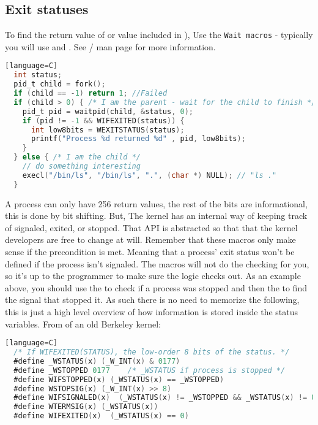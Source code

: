 \subsection{Exit statuses}

To find the return value of  or value included in ), Use the \texttt{Wait macros} - typically you will use  and  . See / man page for more information.

\begin{lstlisting}[language=C][language=C]
  int status;
  pid_t child = fork();
  if (child == -1) return 1; //Failed
  if (child > 0) { /* I am the parent - wait for the child to finish */
    pid_t pid = waitpid(child, &status, 0);
    if (pid != -1 && WIFEXITED(status)) {
      int low8bits = WEXITSTATUS(status);
      printf("Process %d returned %d" , pid, low8bits);
    }
  } else { /* I am the child */
    // do something interesting
    execl("/bin/ls", "/bin/ls", ".", (char *) NULL); // "ls ."
  }
\end{lstlisting}

A process can only have 256 return values, the rest of the bits are informational, this is done by bit shifting. But, The kernel has an internal way of keeping track of signaled, exited, or stopped. That API is abstracted so that that the kernel developers are free to change at will. Remember that these macros only make sense if the precondition is met. Meaning that a process' exit status won't be defined if the process isn't signaled. The macros will not do the checking for you, so it's up to the programmer to make sure the logic checks out. As an example above, you should use the  to check if a process was stopped and then the  to find the signal that stopped it. As such there is no need to memorize the following, this is just a high level overview of how information is stored inside the status variables. From  of an old Berkeley kernel\cite{sys/wait.h}:

\begin{lstlisting}[language=C][language=C]
  /* If WIFEXITED(STATUS), the low-order 8 bits of the status. */
  #define _WSTATUS(x) (_W_INT(x) & 0177)
  #define _WSTOPPED 0177    /* _WSTATUS if process is stopped */
  #define WIFSTOPPED(x) (_WSTATUS(x) == _WSTOPPED)
  #define WSTOPSIG(x) (_W_INT(x) >> 8)
  #define WIFSIGNALED(x)  (_WSTATUS(x) != _WSTOPPED && _WSTATUS(x) != 0)
  #define WTERMSIG(x) (_WSTATUS(x))
  #define WIFEXITED(x)  (_WSTATUS(x) == 0)
\end{lstlisting}

